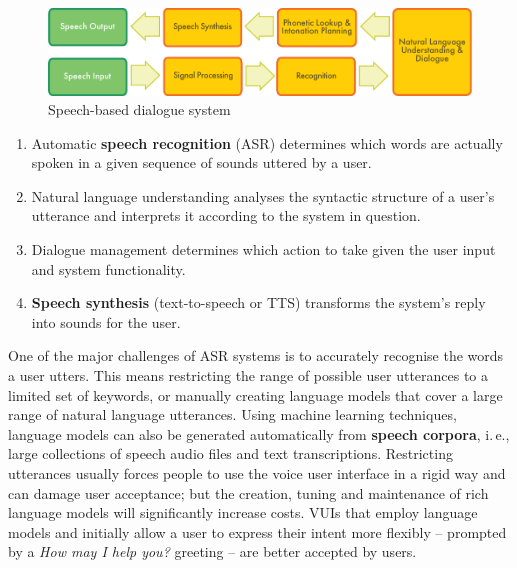 \documentclass[]{../../metanetpaper}
\begin{document}
\begin{multicols}{2}
\begin{figure}[htb]
  \center
  \includegraphics[width=\textwidth]{../_media/english/simple_speech-based_dialogue_architecture}
  \caption{Speech-based dialogue system}
  \label{fig:dialoguearch_en}
\end{figure}

\begin{enumerate}
\item Automatic \textbf{speech recognition} (ASR) determines which words are actually spoken in a given sequence of sounds uttered by a user.  
\item Natural language understanding analyses the syntactic structure of a user’s utterance and interprets it according to the system in question.
\item Dialogue management determines which action to take given the user input and system functionality.   
\item \textbf{Speech synthesis} (text-to-speech or TTS) transforms the system’s reply into sounds for the user.
\end{enumerate}

One of the major challenges of ASR systems is to accurately recognise the words a user utters. This means restricting the range of possible user utterances to a limited set of keywords, or manually creating language models that cover a large range of natural language utterances. Using machine learning techniques, language models can also be generated automatically from \textbf{speech corpora}, i.\,e., large collections of speech audio files and text transcriptions. Restricting utterances usually forces people to use the voice user interface in a rigid way and can damage user acceptance; but the creation, tuning and maintenance of rich language models will significantly increase costs. VUIs that employ language models and initially allow a user to express their intent more flexibly -- prompted by a \textit{How may I help you?} greeting -- are better accepted by users.



\end{multicols}
\end{document}
